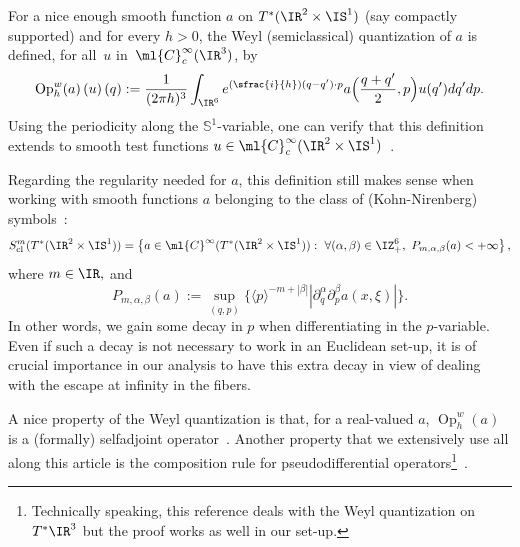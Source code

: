\documentclass[10pt]{amsart}
\newcommand{\Psfrac}[2]{(\sfrac{#1}{#2})}
\theoremstyle{plain}
\theoremstyle{definition}
\theoremstyle{remark}
\newcommand{\Op}{\operatorname{Op}}
\begin{document}
For a nice enough smooth function $a$ on $T^*(\IR^2\times\IS^1)$ (say compactly supported) and for every $h>0$, the Weyl (semiclassical) quantization of $a$ is defined, for all~$u$ in~$\ml{C}^\infty_c(\IR^3)$, by
\begin{equation}%
\text{Op}_h^w(a)\left(u\right)(q):=\frac{1}{(2\pi h)^3}\int_{\IR^6}e^{\Psfrac{i}{h}(q-q')\cdot p}a\Bigl(\frac{q+q'}{2},p\Bigr)u(q')dq'dp.
\end{equation}
Using the periodicity along the $\mathbb{S}^1$-variable, one can verify that this definition extends to smooth test functions $u\in\ml{C}^\infty_c(\IR^2\times\IS^1)$~\cite[\S5.3.1]{Zworski12}.

Regarding the regularity needed for $a$, this definition still makes sense when working with smooth functions $a$ belonging to the class of (Kohn-Nirenberg) symbols~\cite[\S 9.3]{Zworski12}:
\[
S^m_{\textup{cl}}(T^*(\IR^2\times\IS^1))=\left\{a\in\ml{C}^\infty(T^*(\IR^2\times\IS^1)):\ \forall(\alpha,\beta)\in\IZ_+^{6},\ P_{m,\alpha,\beta}(a)<+\infty\right\},
\]
where $m\in\IR,$ and
\[
P_{m,\alpha,\beta}(a):=\sup_{(q,p)}\{\langle p\rangle^{-m+|\beta|}|\partial_q^\alpha\partial_p^\beta a(x,\xi)|\}.
\]
In other words, we gain some decay in $p$ when differentiating in the $p$-variable. Even if such a decay is not necessary to work in an Euclidean set-up, it is of crucial importance in our analysis to have this extra decay in view of dealing with the escape at infinity in the fibers.

A nice property of the Weyl quantization is that, for a real-valued $a$, $\Op_h^w(a)$ is a (formally) selfadjoint operator~\cite[Th.\,4.1]{Zworski12}. Another property that we extensively use all along this article is the composition rule for pseudodifferential operators\footnote{Technically speaking, this reference deals with the Weyl quantization on $T^*\IR^3$ but the proof works as well in our set-up.}~\cite[Th.\,9.5, Th.\,4.12]{Zworski12}.
\end{document}
